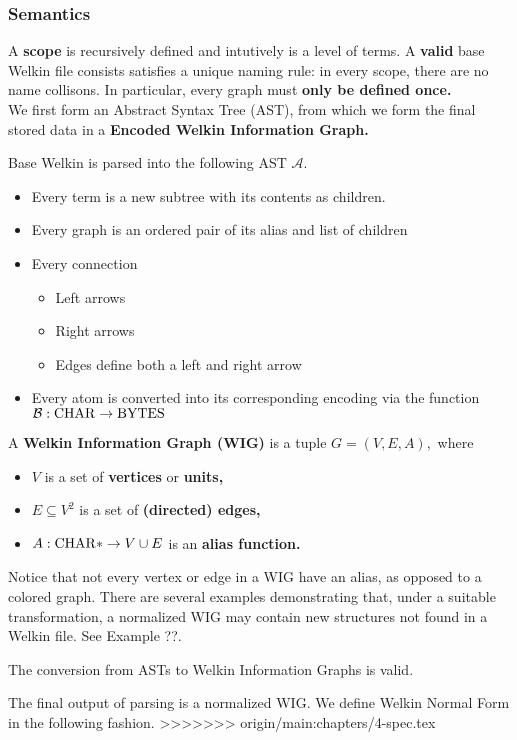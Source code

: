 \subsubsection*{Semantics}
A \textbf{scope} is recursively defined and intutively is a level of terms. A \textbf{valid} base Welkin file consists satisfies a unique naming rule: in every scope, there are no name collisons. In particular, every graph must \textbf{only be defined once.}
\\ We first form an Abstract Syntax Tree (AST), from which we form the final stored data in a \textbf{Encoded Welkin Information Graph.}
\begin{definition}
  Base Welkin is parsed into the following AST $\mathcal{A}.$
  \begin{itemize}
	\item Every term is a new subtree with its contents as children.
    \item Every graph is an ordered pair of its alias and list of children
    \item Every connection
		  \begin{itemize}
			\item Left arrows
			\item Right arrows
			\item Edges define both a left and right arrow
		  \end{itemize}
	\item Every atom is converted into its corresponding encoding via the function $\mathcal{B} : \mathrm{CHAR} \to \mathrm{BYTES}$
\end{itemize}
 \end{definition}
\begin{definition}
	A \textbf{Welkin Information Graph (WIG)} is a tuple $G = (V, E, A),$ where
	\begin{itemize}
		\item $V$ is a set of \textbf{vertices} or \textbf{units,}
		\item $E \subseteq V^{2} $ is a set of \textbf{(directed) edges,}
		\item $A: \mathrm{CHAR}* \to V \cup E$ is an \textbf{alias function.}
	\end{itemize}
  \end{definition}
  Notice that not every vertex or edge in a WIG have an alias, as opposed to a colored graph. There are several examples demonstrating that, under a suitable transformation, a normalized WIG may contain new structures not found in a Welkin file. See Example ??.
\begin{lemma}
The conversion from ASTs to Welkin Information Graphs is valid.
\end{lemma}
The final output of parsing is a normalized WIG. We define Welkin Normal Form in the following fashion.
>>>>>>> origin/main:chapters/4-spec.tex


